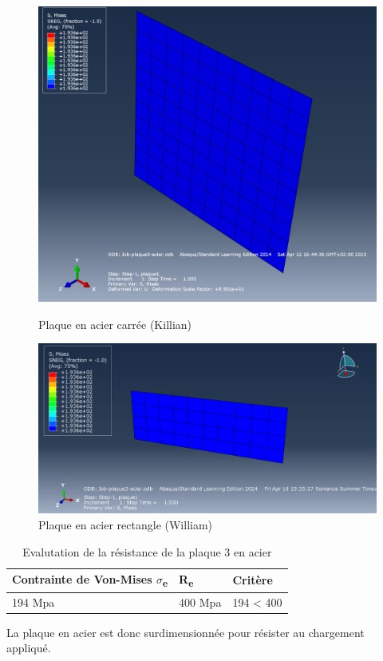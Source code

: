 \documentclass[a4paper,12pt]{article}
\begin{document}
\begin{figure}[H]
	\centering
	\begin{minipage}{0.495\textwidth}
		\centering
		\includegraphics[width=\textwidth]{media/K_P3_mises_12042025.png} %
		\caption{Plaque en acier carrée (Killian)}
		\label{fig:image1}
	\end{minipage}
	\hfill
	\begin{minipage}{0.495\textwidth}
		\centering
		\includegraphics[width=\textwidth]{media/Plaque_metal.png} %
		\caption{Plaque en acier rectangle (William)}
		\label{fig:image2}
	\end{minipage}
\end{figure}

\begin{table}[H]
	\centering
	\begin{tabular}{|l|l|l|}
	\hline
	Contrainte de Von-Mises $\sigma$\textsubscript{e} & R\textsubscript{e}       & Critère \\ \hline
			194 Mpa				& 400 Mpa &     194 < 400    \\ \hline
	\end{tabular}
	\caption{Evalutation de la résistance de la plaque 3 en acier}
	\label{tab:Evalutation de la résistance de la plaque 3 en acier}
	\end{table}
La plaque en acier est donc surdimensionnée pour résister au chargement appliqué.
\end{document}
